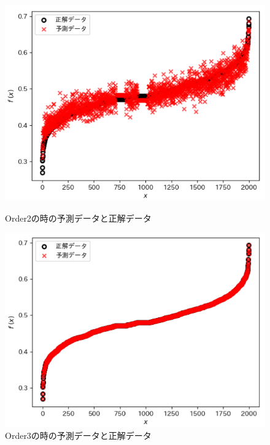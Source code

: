 \documentclass[main]{subfiles}
\begin{document}
        \begin{figure}
          \begin{minipage}[b]{0.45\linewidth}
            \centering
            \includegraphics[width=\linewidth]{figures/o2.png}
            \caption{Order2の時の予測データと正解データ}
            \label{o2}  
          \end{minipage}
          \begin{minipage}[b]{0.45\linewidth}
            \centering
            \includegraphics[width=\linewidth]{figures/o3.png}
            \caption{Order3の時の予測データと正解データ}
            \label{o3}
          \end{minipage}
        \end{figure}
\end{document}
